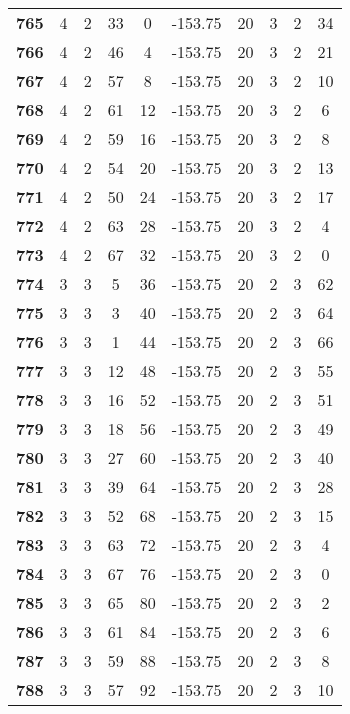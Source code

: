 \documentclass{article}%
\begin{document}
\begin{longtable}{cccccccccc}
        \textbf{765} & 4 & 2 & 33 & 0 & -153.75 & 20 & 3 & 2 & 34 \\ 
        \textbf{766} & 4 & 2 & 46 & 4 & -153.75 & 20 & 3 & 2 & 21 \\ 
        \textbf{767} & 4 & 2 & 57 & 8 & -153.75 & 20 & 3 & 2 & 10 \\ 
        \textbf{768} & 4 & 2 & 61 & 12 & -153.75 & 20 & 3 & 2 & 6 \\ 
        \textbf{769} & 4 & 2 & 59 & 16 & -153.75 & 20 & 3 & 2 & 8 \\ 
        \textbf{770} & 4 & 2 & 54 & 20 & -153.75 & 20 & 3 & 2 & 13 \\ 
        \textbf{771} & 4 & 2 & 50 & 24 & -153.75 & 20 & 3 & 2 & 17 \\ 
        \textbf{772} & 4 & 2 & 63 & 28 & -153.75 & 20 & 3 & 2 & 4 \\ 
        \textbf{773} & 4 & 2 & 67 & 32 & -153.75 & 20 & 3 & 2 & 0 \\ 
        \textbf{774} & 3 & 3 & 5 & 36 & -153.75 & 20 & 2 & 3 & 62 \\ 
        \textbf{775} & 3 & 3 & 3 & 40 & -153.75 & 20 & 2 & 3 & 64 \\ 
        \textbf{776} & 3 & 3 & 1 & 44 & -153.75 & 20 & 2 & 3 & 66 \\ 
        \textbf{777} & 3 & 3 & 12 & 48 & -153.75 & 20 & 2 & 3 & 55 \\ 
        \textbf{778} & 3 & 3 & 16 & 52 & -153.75 & 20 & 2 & 3 & 51 \\ 
        \textbf{779} & 3 & 3 & 18 & 56 & -153.75 & 20 & 2 & 3 & 49 \\ 
        \textbf{780} & 3 & 3 & 27 & 60 & -153.75 & 20 & 2 & 3 & 40 \\ 
        \textbf{781} & 3 & 3 & 39 & 64 & -153.75 & 20 & 2 & 3 & 28 \\ 
        \textbf{782} & 3 & 3 & 52 & 68 & -153.75 & 20 & 2 & 3 & 15 \\ 
        \textbf{783} & 3 & 3 & 63 & 72 & -153.75 & 20 & 2 & 3 & 4 \\ 
        \textbf{784} & 3 & 3 & 67 & 76 & -153.75 & 20 & 2 & 3 & 0 \\ 
        \textbf{785} & 3 & 3 & 65 & 80 & -153.75 & 20 & 2 & 3 & 2 \\ 
        \textbf{786} & 3 & 3 & 61 & 84 & -153.75 & 20 & 2 & 3 & 6 \\ 
        \textbf{787} & 3 & 3 & 59 & 88 & -153.75 & 20 & 2 & 3 & 8 \\ 
        \textbf{788} & 3 & 3 & 57 & 92 & -153.75 & 20 & 2 & 3 & 10 \\ 

\end{longtable}
\end{document}
